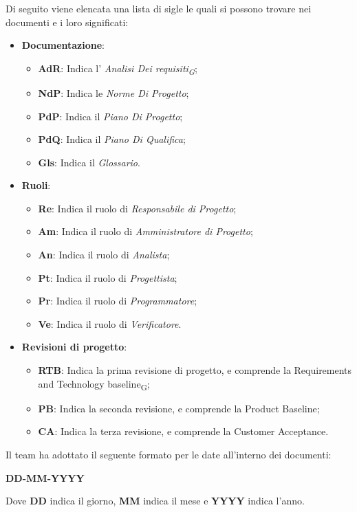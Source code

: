 Di seguito viene elencata una lista di sigle le quali si possono trovare nei documenti e i loro significati:
\begin{itemize}
\item \textbf{Documentazione}:
	\begin{itemize}
	\item \textbf{AdR}: Indica l' \textit{Analisi Dei requisiti\textsubscript{G}};
	\item \textbf{NdP}: Indica le \textit{Norme Di Progetto};
	\item \textbf{PdP}: Indica il \textit{Piano Di Progetto};
	\item \textbf{PdQ}: Indica il \textit{Piano Di Qualifica};
	\item \textbf{Gls}: Indica il \textit{Glossario}.
	\end{itemize}
\item \textbf{Ruoli}:
	\begin{itemize}
	\item \textbf{Re}: Indica il ruolo di \textit{Responsabile di Progetto};
	\item \textbf{Am}: Indica il ruolo di \textit{Amministratore di Progetto};
	\item \textbf{An}: Indica il ruolo di \textit{Analista};
	\item \textbf{Pt}: Indica il ruolo di \textit{Progettista};
	\item \textbf{Pr}: Indica il ruolo di \textit{Programmatore};
	\item \textbf{Ve}: Indica il ruolo di \textit{Verificatore}.
	\end{itemize}
\item \textbf{Revisioni di progetto}:
	\begin{itemize}
		\item \textbf{RTB}: Indica la prima revisione di progetto, e comprende la Requirements and Technology baseline\textsubscript{G};
		\item \textbf{PB}: Indica la seconda revisione, e comprende la Product Baseline;
		\item \textbf{CA}: Indica la terza revisione, e comprende la Customer Acceptance.
	\end{itemize}
\end{itemize}
Il team ha adottato il seguente formato per le date all'interno dei documenti:
\begin{center}
    \large{\textbf{DD-MM-YYYY}}
\end{center}
Dove \textbf{DD} indica il giorno, \textbf{MM} indica il mese e \textbf{YYYY} indica l'anno.

